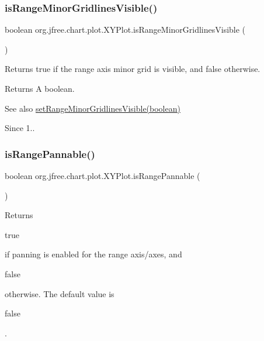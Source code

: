 \subsubsection{\texorpdfstring{is\+Range\+Minor\+Gridlines\+Visible()}{isRangeMinorGridlinesVisible()}}
{\footnotesize\ttfamily boolean org.\+jfree.\+chart.\+plot.\+X\+Y\+Plot.\+is\+Range\+Minor\+Gridlines\+Visible (\begin{DoxyParamCaption}{ }\end{DoxyParamCaption})}

Returns {\ttfamily true} if the range axis minor grid is visible, and {\ttfamily false} otherwise.

\begin{DoxyReturn}{Returns}
A boolean.
\end{DoxyReturn}
\begin{DoxySeeAlso}{See also}
\mbox{\hyperlink{classorg_1_1jfree_1_1chart_1_1plot_1_1_x_y_plot_ae6bd0087340613ea30ea0a9d439cc9cc}{set\+Range\+Minor\+Gridlines\+Visible(boolean)}}
\end{DoxySeeAlso}
\begin{DoxySince}{Since}
1.. 
\end{DoxySince}
\mbox{\label{classorg_1_1jfree_1_1chart_1_1plot_1_1_x_y_plot_a8f1c9a3d422e99f3dd189ba632ba3843}} 
\subsubsection{\texorpdfstring{is\+Range\+Pannable()}{isRangePannable()}}
{\footnotesize\ttfamily boolean org.\+jfree.\+chart.\+plot.\+X\+Y\+Plot.\+is\+Range\+Pannable (\begin{DoxyParamCaption}{ }\end{DoxyParamCaption})}

Returns
\begin{DoxyCode}
\textcolor{keyword}{true} 
\end{DoxyCode}
 if panning is enabled for the range axis/axes, and
\begin{DoxyCode}
\textcolor{keyword}{false} 
\end{DoxyCode}
 otherwise. The default value is
\begin{DoxyCode}
\textcolor{keyword}{false} 
\end{DoxyCode}
 .

